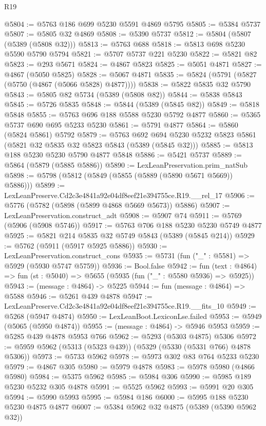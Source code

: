 \begin{lexlean}{R19}
\begin{coremodule}
@5804 := @5763 @186 @699 @5230 @5591 @4869 @5795
@5805 := @5384 @5737
@5807 := @5805 @32 @4869
@5808 := @5390 @5737
@5812 := @5804 (@5807 (@5389 (@5808 @32)))
@5813 := @5763 @688
@5818 := @5813 @698 @5230 @5590 @5790 @5794
@5821 := @5707 @5737 @221 @5230
@5822 := @5821 @82
@5823 := @293 @5671
@5824 := @4867 @5823
@5825 := @5051 @4871
@5827 := @4867 (@5050 @5825)
@5828 := @5067 @4871
@5835 := @5824 (@5791 (@5827 (@5750 (@4867 (@5066 @5828) @4877))))
@5838 := @5822 @5835 @32 @5790
@5843 := @5805 @82 @5734 (@5389 (@5808 @82))
@5844 := @5838 @5843
@5845 := @5726 @5835
@5848 := @5844 (@5389 (@5845 @82))
@5849 := @5818 @5848
@5855 := @5763 @696 @188 @5588 @5230 @5792 @4877
@5860 := @5365 @5737 @690 @695 @5233 @5230
@5861 := @5791 @4877
@5864 := @5860 (@5824 @5861) @5792
@5879 := @5763
    @692
    @694
    @5230
    @5232
    @5823
    @5861
    (@5821 @32 @5835 @32 @5823 @5843 (@5389 (@5845 @32)))
@5885 := @5813 @188 @5230 @5230 @5790 @4877 @5848
@5886 := @5421 @5737
@5889 := @5864 (@5879 (@5885 @5886))
@5890 := LexLeanPreservation.prim_natSub
@5898 := @5798 (@5812 (@5849 (@5855 (@5889 (@5890 @5671 @5669)) @5886)))
@5899 := LexLeanPreserve.Cd2c3e4841a92e04df8eef21e394755ce.R19.__rel_17
@5906 := @5776 (@5782 (@5898 (@5899 @4868 @5669 @5673)) @5886)
@5907 := LexLeanPreservation.construct_adt
@5908 := @5907 @74
@5911 := @5769 (@5906 (@5908 @5746))
@5917 := @5763 @706 @188 @5230 @5230 @5749 @4877
@5925 := @5821 @214 @5835 @32 @5749 @5843 (@5389 (@5845 @214))
@5929 := @5762 (@5911 (@5917 @5925 @5886))
@5930 := LexLeanPreservation.construct_cons
@5935 := @5731 (fun ("_" : @5581) => @5929 (@5930 @5747 @5759))
@5936 := Bool.false
@5942 := fun (text : @4864) => fun (st : @5040) => @5655 (@5935 (fun ("_" : @5580 @5936) => @5925))
@5943 := (message : @4864) -> @5225
@5944 := fun (message : @4864) => @5588
@5946 := @5261 @439 @4878
@5947 := LexLeanPreserve.Cd2c3e4841a92e04df8eef21e394755ce.R19.__fits_10
@5949 := @5268 (@5947 @4874)
@5950 := LexLeanBoot.LexiconLse.failed
@5953 := @5949 (@5065 (@5950 @4874))
@5955 := (message : @4864) -> @5946 @5953
@5959 := @5285 @439 @4878 @5953 @766
@5962 := @5293 (@5303 @4875) @5306
@5972 := @5959 @5962 (@5313 (@5323 @439)) (@5329 (@5330 (@5331 @766) @4878 @5306))
@5973 := @5733 @5962
@5978 := @5973 @302 @83 @764 @5233 @5230
@5979 := @4867 @305
@5980 := @5979 @4878
@5983 := @5978 @5980 (@4866 @5980)
@5984 := @5375 @5962
@5985 := @5984 @306
@5990 := @5985 @189 @5230 @5232 @305 @4878
@5991 := @5525 @5962
@5993 := @5991 @20 @305
@5994 := @5990 @5993
@5995 := @5984 @186
@6000 := @5995 @188 @5230 @5230 @4875 @4877
@6007 := @5384 @5962 @32 @4875 (@5389 (@5390 @5962 @32))

\end{coremodule}
\end{lexlean}
